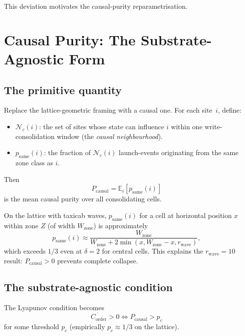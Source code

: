 \documentclass[11pt,a4paper]{article}
\newcommand{\Corder}{C_{\mathrm{order}}}
\newcommand{\psame}{p_{\mathrm{same}}}
\newcommand{\Pcausal}{P_{\mathrm{causal}}}
\begin{document}
This deviation motivates the causal-purity reparametrisation.

\section{Causal Purity: The Substrate-Agnostic Form}

\subsection{The primitive quantity}

Replace the lattice-geometric framing with a causal one. For each site~$i$, define:
\begin{itemize}
  \item $\mathcal{N}_c(i)$: the set of sites whose state can influence $i$ within
    one write-consolidation window (the \emph{causal neighbourhood}).
  \item $\psame(i)$: the fraction of $\mathcal{N}_c(i)$ launch-events originating
    from the same zone class as $i$.
\end{itemize}
Then
\begin{equation}
  \Pcausal = \mathbb{E}_i[\psame(i)]
\end{equation}
is the mean causal purity over all consolidating cells.

On the lattice with taxicab waves, $\psame(i)$ for a cell at horizontal position
$x$ within zone $Z$ (of width $W_\mathrm{zone}$) is approximately
\begin{equation}
  \psame(i) \approx \frac{W_\mathrm{zone}}
    {W_\mathrm{zone} + 2\min(x, W_\mathrm{zone}-x, r_\mathrm{wave})},
\end{equation}
which exceeds $1/3$ even at $\delta=2$ for central cells.
This explains the $r_\mathrm{wave}=10$ result: $\Pcausal > 0$ prevents complete
collapse.

\subsection{The substrate-agnostic condition}

The Lyapunov condition becomes
\begin{equation}
  \boxed{\dot{\Corder} > 0 \iff \Pcausal > p_c}
  \label{eq:causal}
\end{equation}
for some threshold $p_c$ (empirically $p_c \approx 1/3$ on the lattice).
\end{document}
